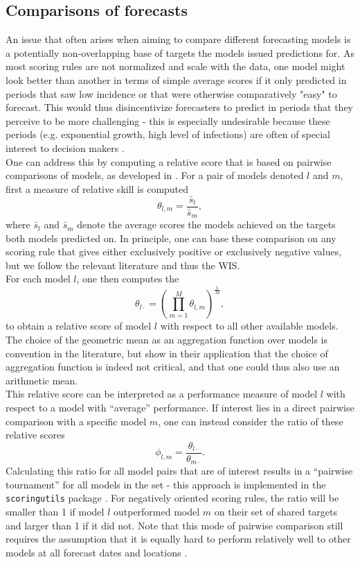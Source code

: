 \subsection{Comparisons of forecasts}
An issue that often arises when aiming to compare different forecasting models is a potentially non-overlapping base of targets the models issued predictions for. As most scoring rules are not normalized and scale with the data, %
one model might look better than another in terms of simple average scores if it only predicted in periods that saw low incidence or that were otherwise comparatively "easy" to forecast. This would thus disincentivize forecasters to predict in periods that they perceive to be more challenging - this is especially undesirable because these periods (e.g. exponential growth, high level of infections) are often of special interest to decision makers .\\
One can address this by computing a relative score that is based on pairwise comparisons of models, as developed in \cite{cramer_evaluation_2022}. For a pair of models denoted $l$ and $m$, first a measure of relative skill is computed
\[
\theta_{l,m} = \frac{\bar{s}_{l}}{\bar{s}_{m}},
\]
where $\bar{s}_{l}$ and $\bar{s}_{m}$ denote the average scores the models achieved on the targets both models predicted on. In principle, one can base these comparison on any scoring rule that gives either exclusively positive or exclusively negative values, but we follow the relevant literature and thus the WIS.\\
For each model $l$, one then computes the 
\[
\theta_{l\cdot} = \left(\prod_{m = 1}^{M}\theta_{l,m} \right)^{\frac{1}{M}},
\]to obtain a relative score of model $l$ with respect to all other available models. The choice of the geometric mean as an aggregation function over models is convention in the literature, but \cite{ray_comparing_2022} show in their application that the choice of aggregation function is indeed not critical, and that one could thus also use an arithmetic mean. \\
This relative score can be interpreted as a performance measure of model $l$ with respect to a model with ``average'' performance. If interest lies in a direct pairwise comparison with a specific model $m$, one can instead consider the ratio of these relative scores
\[
\phi_{l,m} = \frac{\theta_{l\cdot}}{\theta_{m\cdot}}.
\]
Calculating this ratio for all model pairs that are of interest results in a ``pairwise tournament'' for all models in the set - this approach is implemented in the \texttt{scoringutils} package \citep{bosse_epiforecastsscoringutils_2022}. For negatively oriented scoring rules, the ratio will be smaller than 1 if model $l$ outperformed model $m$ on their set of shared targets and larger than 1 if it did not. Note that this mode of pairwise comparison still requires the assumption that it is equally hard to perform relatively well to other models at all forecast dates and locations \citep{cramer_evaluation_2022}.\\
